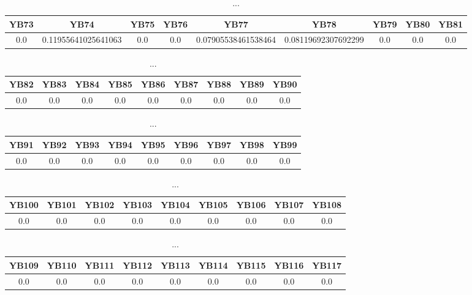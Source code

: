 \documentclass[]{article}
\begin{document}
\begin{table}[h]
      \centering
      \begin{tabular}{|c|c|c|c|c|c|c|c|c|}
            \hline
            YB73 & YB74                & YB75 & YB76 & YB77                & YB78                & YB79 & YB80 & YB81 \\
            \hline
            0.0  & 0.11955641025641063 & 0.0  & 0.0  & 0.07905538461538464 & 0.08119692307692299 & 0.0  & 0.0  & 0.0  \\
            \hline
      \end{tabular}
      \caption{...}
\end{table}
\begin{table}[h]
      \centering
      \begin{tabular}{|c|c|c|c|c|c|c|c|c|}
            \hline
            YB82 & YB83 & YB84 & YB85 & YB86 & YB87 & YB88 & YB89 & YB90 \\
            \hline
            0.0  & 0.0  & 0.0  & 0.0  & 0.0  & 0.0  & 0.0  & 0.0  & 0.0  \\
            \hline
      \end{tabular}
      \caption{...}
\end{table}
\begin{table}[h]
      \centering
      \begin{tabular}{|c|c|c|c|c|c|c|c|c|}
            \hline
            YB91 & YB92 & YB93 & YB94 & YB95 & YB96 & YB97 & YB98 & YB99 \\
            \hline
            0.0  & 0.0  & 0.0  & 0.0  & 0.0  & 0.0  & 0.0  & 0.0  & 0.0  \\
            \hline
      \end{tabular}
      \caption{...}
\end{table}
\begin{table}[h]
      \centering
      \begin{tabular}{|c|c|c|c|c|c|c|c|c|}
            \hline
            YB100 & YB101 & YB102 & YB103 & YB104 & YB105 & YB106 & YB107 & YB108 \\
            \hline
            0.0   & 0.0   & 0.0   & 0.0   & 0.0   & 0.0   & 0.0   & 0.0   & 0.0   \\
            \hline
      \end{tabular}
      \caption{...}
\end{table}
\begin{table}[h]
      \centering
      \begin{tabular}{|c|c|c|c|c|c|c|c|c|}
            \hline
            YB109 & YB110 & YB111 & YB112 & YB113 & YB114 & YB115 & YB116 & YB117 \\
            \hline
            0.0   & 0.0   & 0.0   & 0.0   & 0.0   & 0.0   & 0.0   & 0.0   & 0.0   \\
            \hline
      \end{tabular}
      \caption{...}
\end{table}
\end{document}

